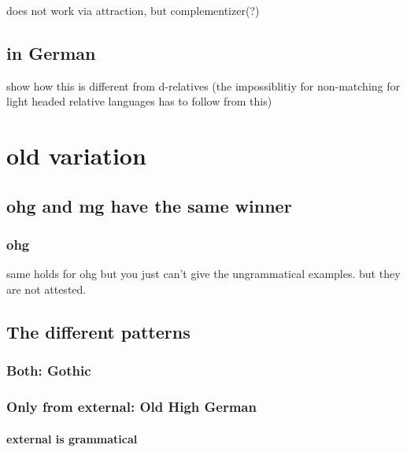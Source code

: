 does not work via attraction, but complementizer(?)








\section{ in German}

show how this is different from d-relatives (the impossiblitiy for non-matching for   light headed relative languages has to follow from this)








\chapter*{old variation}

\section{\ac{ohg} and \ac{mg} have the same winner}


\subsection{\ac{ohg}}

same holds for \ac{ohg} but you just can't give the ungrammatical examples. but they are not attested.



\section{The different patterns}




\subsection{Both: Gothic}









 \subsection{Only from external: Old High German}


  \subsubsection{external is grammatical}


